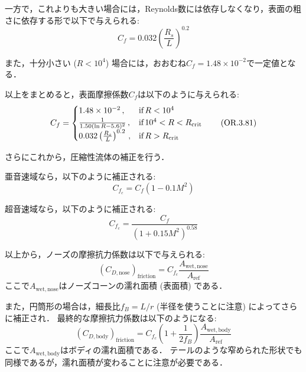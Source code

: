 \documentclass[uplatex,dvipdfmx,a4j,11pt]{jsarticle}
\begin{document}
一方で，これよりも大きい場合には，Reynolds数には依存しなくなり，表面の粗さに依存する形で以下で与えられる:
\begin{equation}
  C_f = 0.032 \left(\frac{R_s}{L}\right)^{0.2}
  \tag{OR.3.80}
\end{equation}

また，十分小さい ($R < 10^4$) 場合には，おおむね$C_f = 1.48\times 10^{-2}$で一定値となる．

以上をまとめると，表面摩擦係数$C_f$は以下のように与えられる:
\begin{equation}
  C_f = \begin{cases}
    1.48\times 10^{-2}\,, & \text{if\,} R < 10^4 \\
    \frac{1}{1.50 (\ln R - 5.6)^2}\,, &  \text{if\,} 10^4 < R < R_\mathrm{crit} \\
    0.032 \left(\frac{R_s}{L}\right)^{0.2}\,, & \text{if\,} R > R_\mathrm{crit}
  \end{cases}
  \tag{OR.3.81}
\end{equation}

\enskip

さらにこれから，圧縮性流体の補正を行う．

亜音速域なら，以下のように補正される:
\begin{equation}
  C_{f_c} = C_f (1 - 0.1 M^2)
  \tag{OR.3.82}
\end{equation}

超音速域なら，以下のように補正される:
\begin{equation}
  C_{f_c} = \frac{C_f}{(1 + 0.15 M^2)^{0.58}}
  \tag{OR.3.83}
\end{equation}

\enskip

以上から，ノーズの摩擦抗力係数は以下で与えられる:
\begin{equation}
  (C_{D, \text{nose}})_\text{friction} = C_{f_c} \frac{A_\mathrm{wet, nose}}{A_\mathrm{ref}}
\end{equation}
ここで$A_\mathrm{wet, nose}$はノーズコーンの濡れ面積 (表面積) である．

また，円筒形の場合は，細長比$f_B = L / r$ (半径を使うことに注意) によってさらに補正され．
最終的な摩擦抗力係数は以下のようになる:
\begin{equation}
  (C_{D, \text{body}})_\text{friction} = C_{f_c} \left(1 + \frac{1}{2 f_B}\right) \frac{A_\mathrm{wet, body}}{A_\mathrm{ref}}
\end{equation}
ここで$A_\mathrm{wet, body}$はボディの濡れ面積である．
テールのような窄められた形状でも同様であるが，濡れ面積が変わることに注意が必要である．
\end{document}
